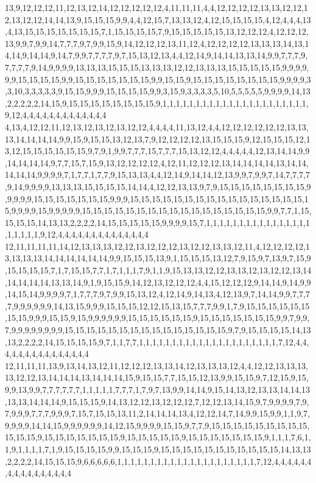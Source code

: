 13,9,12,12,12,11,12,13,12,14,12,12,12,12,12,4,11,11,11,4,4,12,12,12,12,13,13,12,12,12,13,12,12,14,14,13,9,15,15,15,9,9,4,4,12,15,7,13,13,12,4,12,15,15,15,15,4,12,4,4,4,13,4,13,15,15,15,15,15,15,15,7,1,15,15,15,15,7,9,15,15,15,15,15,13,12,12,12,4,12,12,12,13,9,9,7,9,9,14,7,7,7,9,7,9,9,15,9,14,12,12,12,13,11,12,4,12,12,12,12,13,13,13,14,13,14,14,9,14,14,9,14,7,9,9,7,7,7,7,9,7,15,13,12,13,4,4,12,14,9,14,14,13,13,14,9,9,7,7,7,9,7,7,7,7,9,14,9,9,9,9,13,13,13,15,15,15,13,13,13,12,12,13,13,13,15,15,15,15,15,9,9,9,9,9,9,15,15,15,15,9,9,15,15,15,15,15,15,15,9,9,15,15,9,15,15,15,15,15,15,15,15,9,9,9,9,3,3,10,3,3,3,3,3,9,15,15,9,9,9,15,15,15,15,9,9,3,15,9,3,3,3,3,5,10,5,5,5,5,5,9,9,9,9,14,13,2,2,2,2,2,14,15,9,15,15,15,15,15,15,15,15,9,1,1,1,1,1,1,1,1,1,1,1,1,1,1,1,1,1,1,1,1,1,1,9,12,4,4,4,4,4,4,4,4,4,4,4,4,4
4,13,4,12,12,11,12,13,12,13,12,13,12,12,4,4,4,4,11,13,12,4,4,12,12,12,12,12,12,13,13,13,14,14,14,14,9,9,15,9,15,15,13,12,13,7,9,12,12,12,12,13,15,15,15,9,12,15,15,15,12,13,12,15,15,15,15,15,15,9,7,9,1,9,9,7,7,7,15,7,7,7,15,13,12,12,4,4,4,4,4,12,13,14,14,9,9,14,14,14,14,9,7,7,15,7,15,9,13,12,12,12,12,4,12,11,12,12,12,13,14,14,14,14,13,14,14,14,14,14,9,9,9,9,7,1,7,7,1,7,7,9,15,13,13,4,4,12,14,9,14,14,12,13,9,9,7,9,9,7,14,7,7,7,7,9,14,9,9,9,9,13,13,13,15,15,15,15,14,14,4,12,12,13,13,9,7,9,15,15,15,15,15,15,15,15,9,9,9,9,9,15,15,15,15,15,15,15,9,9,9,15,15,15,15,15,15,15,15,15,15,15,15,15,15,15,15,15,9,9,9,9,15,9,9,9,9,9,15,15,15,15,15,15,15,15,15,15,15,15,15,15,15,15,15,9,9,7,7,1,15,15,15,15,14,13,13,2,2,2,2,14,15,15,15,15,15,9,9,9,9,15,7,1,1,1,1,1,1,1,1,1,1,1,1,1,1,1,1,1,1,1,1,1,9,12,4,4,4,4,4,4,4,4,4,4,4,4,4,4
12,11,11,11,11,14,12,13,13,13,12,12,13,12,12,12,13,12,12,13,13,12,11,4,12,12,12,12,13,13,13,13,14,14,14,14,14,14,9,9,15,15,15,13,9,1,15,15,15,13,12,7,9,15,9,7,13,9,7,15,9,15,15,15,15,7,1,7,15,15,7,7,1,7,1,1,1,7,9,1,1,9,15,13,13,12,12,13,13,12,13,12,12,13,14,14,14,14,14,13,13,14,9,1,9,15,15,9,14,12,13,12,12,12,4,4,15,12,12,12,9,14,14,9,14,9,9,14,15,14,9,9,9,9,7,1,7,7,7,9,7,9,9,15,13,12,4,12,14,9,14,13,4,12,13,9,7,14,14,9,9,7,7,7,7,9,9,9,9,9,9,14,13,15,9,9,9,15,15,15,12,12,15,13,15,7,7,7,9,9,1,7,9,15,15,15,15,15,15,15,15,9,9,9,15,15,9,15,9,9,9,9,9,9,15,15,15,15,15,15,9,15,15,15,15,15,15,15,9,9,7,9,9,7,9,9,9,9,9,9,9,9,15,15,15,15,15,15,15,15,15,15,15,15,15,15,15,9,7,9,15,15,15,15,14,13,13,2,2,2,2,14,15,15,15,15,9,7,1,1,7,7,1,1,1,1,1,1,1,1,1,1,1,1,1,1,1,1,1,1,1,1,1,7,12,4,4,4,4,4,4,4,4,4,4,4,4,4,4,4
12,11,11,11,13,9,13,14,13,12,11,12,12,12,13,13,14,12,13,13,13,12,4,4,12,12,13,13,13,13,12,12,13,14,14,14,13,14,14,14,15,9,15,15,7,7,15,15,12,13,9,9,15,15,9,7,12,15,9,15,9,9,13,9,9,7,7,7,7,7,7,1,1,1,1,1,7,7,7,1,7,9,7,13,9,9,14,14,9,15,14,13,12,13,13,14,14,13,13,13,14,14,14,9,15,15,15,9,14,13,12,12,13,12,12,12,7,12,12,13,14,15,9,7,9,9,9,9,7,9,7,9,9,9,7,7,7,9,9,9,7,15,7,15,15,13,11,2,14,14,14,13,4,12,12,14,7,14,9,9,15,9,9,1,1,9,7,9,9,9,9,14,14,15,9,9,9,9,9,9,14,12,15,9,9,9,9,15,15,9,7,7,9,15,15,15,15,15,15,15,15,15,15,15,15,9,15,15,15,15,15,15,15,9,15,15,15,15,15,9,15,15,15,15,15,15,15,9,1,1,1,7,6,1,1,9,1,1,1,1,7,1,9,15,15,15,15,9,9,15,15,15,9,15,15,15,15,15,15,15,15,15,15,15,14,13,13,2,2,2,2,14,15,15,15,9,6,6,6,6,6,1,1,1,1,1,1,1,1,1,1,1,1,1,1,1,1,1,1,1,1,1,7,12,4,4,4,4,4,4,4,4,4,4,4,4,4,4,4,4
